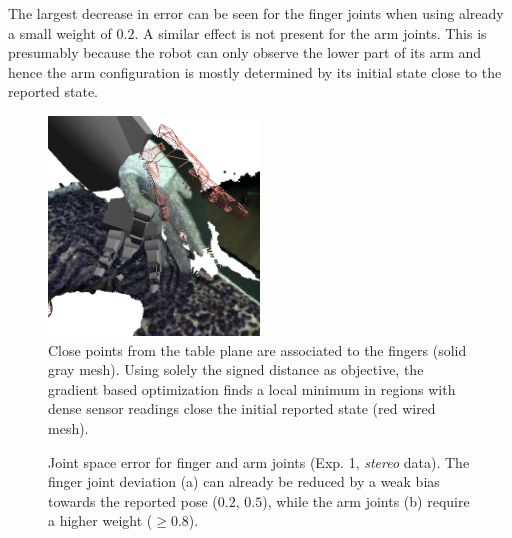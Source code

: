 The largest decrease in error can be seen for the finger joints when using already a small weight of $0.2$. A similar effect is not present for the arm joints. This is presumably because the robot can only observe the lower part of its arm and hence the arm configuration is mostly determined by its initial state close to the reported state.

\begin{figure}
\centering
\includegraphics[width=0.5\textwidth]{images/eval_prior/fingers_in_table.png}
\caption[Wrong association of data points]{Close points from the table plane are associated to the fingers (solid gray mesh). Using solely the signed distance as objective, the gradient based optimization finds a local minimum in regions with dense sensor readings close the initial reported state (red wired mesh).}
\label{fig:no_prior_fingers_table}
\end{figure}

\begin{figure}[h]
\centering
{}
%
\caption[Joint space error (Exp. 1, stereo)]{Joint space error for finger and arm joints (Exp. 1, \textit{stereo} data). The finger joint deviation (a) can already be reduced by a weak bias towards the reported pose ($0.2$, $0.5$), while the arm joints (b) require a higher weight ($\geq0.8$).}
\label{fig:stereo_joint_error}
\end{figure}

